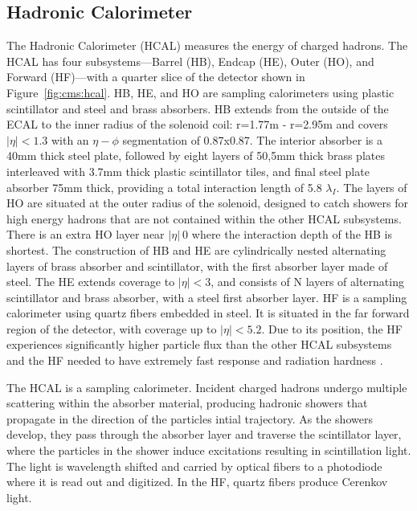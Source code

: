 \subsection{Hadronic Calorimeter}\label{ch:cms:hcal}
The Hadronic Calorimeter (HCAL) measures the energy of charged hadrons. 
The HCAL has four subsystems---Barrel (HB), Endcap (HE), Outer (HO), and Forward (HF)---with a quarter slice of the detector shown in Figure~\ref{fig:cms:hcal}.  HB, HE, and HO are sampling calorimeters using plastic scintillator and steel and brass absorbers. HB extends from the outside of the ECAL to the inner radius of the solenoid coil: r=1.77m - r=2.95m and covers $|\eta| < 1.3$ with an $\eta-\phi$ segmentation of 0.87x0.87. The interior absorber is a 40mm thick steel plate, followed by eight layers of 50,5mm thick brass plates interleaved with 3.7mm thick plastic scintillator tiles, and final steel plate absorber 75mm thick, providing a total interaction length of 5.8 $\lambda_I$.   The layers of HO are situated at the outer radius of the solenoid, designed to catch showers for high energy hadrons that are not contained within the other HCAL subsystems. There is an extra HO layer near $|\eta|~0$ where the interaction depth of the HB is shortest. The construction of HB and HE are cylindrically nested alternating layers of brass absorber and scintillator, with the first absorber layer made of steel. The HE extends coverage to $|\eta| < 3$, and consists of N layers of alternating scintillator and brass absorber, with a steel first absorber layer.
HF is a sampling calorimeter using quartz fibers embedded in steel. It is situated in the far forward region of the detector, with coverage up to $|\eta| < 5.2$. Due to its position, the HF experiences significantly higher particle flux than the other HCAL subsystems and the HF needed to have extremely fast response and radiation hardness
\cite{CERN-LHCC-97-031}.




The HCAL is a sampling calorimeter. Incident charged hadrons undergo multiple scattering within the absorber material, producing hadronic showers that propagate in the direction of the particles intial trajectory. As the showers develop, they pass through the absorber layer and traverse the scintillator layer, where the particles in the shower induce excitations resulting in scintillation light. The light is wavelength shifted and carried by optical fibers to a photodiode where it is read out and digitized. In the HF, quartz fibers produce Cerenkov light. 



